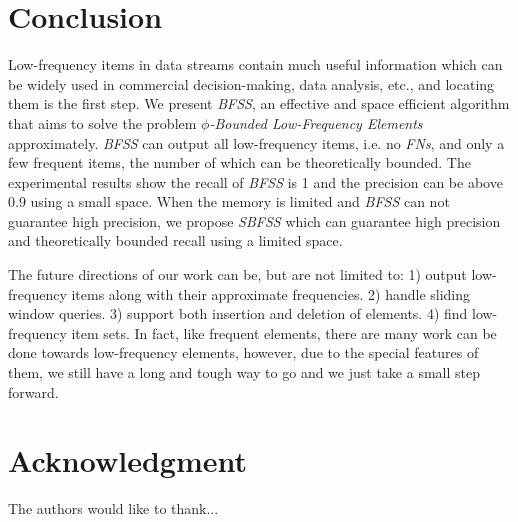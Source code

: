 \documentclass[conference]{IEEEtran}
\begin{document}
\section{Conclusion}
Low-frequency items in data streams contain much useful information which can be widely used in commercial decision-making, data analysis, etc., and locating them is the first step. We present \emph{BFSS}, an effective and space efficient algorithm that aims to solve the problem \emph{$\phi$-Bounded Low-Frequency Elements} approximately. \emph{BFSS} can output all low-frequency items, i.e. no \emph{FNs}, and only a few frequent items, the number of which can be theoretically bounded. The experimental results show the recall of \emph{BFSS} is 1 and the precision can be above 0.9 using a small space. When the memory is limited and \emph{BFSS} can not guarantee high precision, we propose \emph{SBFSS} which can guarantee high precision and theoretically bounded recall using a limited space. \par
The future directions of our work can be, but are not limited to: 1) output low-frequency items along with their approximate frequencies. 2) handle sliding window queries. 3) support both insertion and deletion of elements. 4) find low-frequency item sets. In fact, like frequent elements, there are many work can be done towards low-frequency elements, however, due to the special features of them, we still have a long and tough way to go and we just take a small step forward.








\section*{Acknowledgment}


The authors would like to thank...






\end{document}
